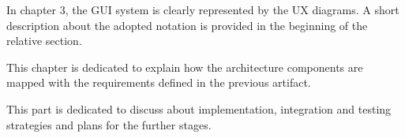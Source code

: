 {{}
In chapter 3, the GUI system is clearly represented by the UX diagrams. A short description about the adopted notation is provided in the beginning of the relative section.


{}
This chapter is dedicated to explain how the architecture components are mapped with the requirements defined in the previous artifact.


{}
This part is dedicated to discuss about implementation, integration and testing strategies and plans for the further stages. 

}